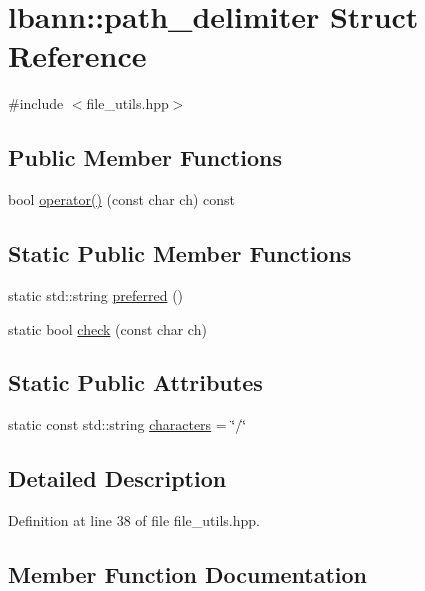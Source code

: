 \hypertarget{structlbann_1_1path__delimiter}{}\section{lbann\+:\+:path\+\_\+delimiter Struct Reference}
\label{structlbann_1_1path__delimiter}


{\ttfamily \#include $<$file\+\_\+utils.\+hpp$>$}

\subsection*{Public Member Functions}
\begin{DoxyCompactItemize}
\item 
bool \hyperlink{structlbann_1_1path__delimiter_a89e287e7a7c4b4fc2863da116f199a71}{operator()} (const char ch) const
\end{DoxyCompactItemize}
\subsection*{Static Public Member Functions}
\begin{DoxyCompactItemize}
\item 
static std\+::string \hyperlink{structlbann_1_1path__delimiter_a4f3bb346e47a66b16419125b1485e2ef}{preferred} ()
\item 
static bool \hyperlink{structlbann_1_1path__delimiter_adb3d520b3e7b9f9aa8327245ea943bdf}{check} (const char ch)
\end{DoxyCompactItemize}
\subsection*{Static Public Attributes}
\begin{DoxyCompactItemize}
\item 
static const std\+::string \hyperlink{structlbann_1_1path__delimiter_ac64e71aff928b202c0c9e880ea641315}{characters} = \char`\"{}/\char`\"{}
\end{DoxyCompactItemize}


\subsection{Detailed Description}


Definition at line 38 of file file\+\_\+utils.\+hpp.



\subsection{Member Function Documentation}
\mbox{\label{structlbann_1_1path__delimiter_adb3d520b3e7b9f9aa8327245ea943bdf}} 
